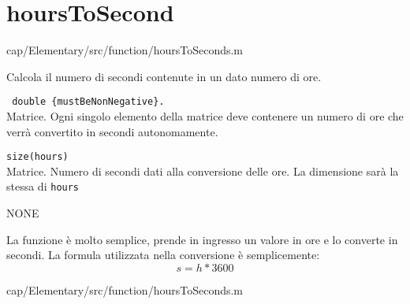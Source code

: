\section{hoursToSecond}\label{fnc:hoursToSecond}


{cap/Elementary/src/function/hoursToSeconds.m}%

Calcola il numero di secondi contenute in un dato numero di ore.

\begin{tcolorbox}
    \begin{description} 
\setlength{\itemindent}{-.2in}
    \item[\textit{hours:}] \verb| double {mustBeNonNegative}.|\\
    Matrice. Ogni singolo elemento della matrice deve contenere un numero di 
    ore che verrà convertito in secondi autonomamente.
\end{description}
\end{tcolorbox}

\begin{tcolorbox}
\begin{description}
\setlength{\itemindent}{-.2in}
    \item[\textit{seconds:}] \verb|size(hours)| \\
     Matrice. Numero di secondi dati alla conversione delle ore. La dimensione 
     sarà la stessa di \verb|hours|
\end{description}
\end{tcolorbox}

{\color{gray} NONE}

La funzione è molto semplice, prende in ingresso un valore in ore 
e lo converte in secondi. La formula utilizzata nella conversione 
è semplicemente: 
$$s=h*3600$$

{cap/Elementary/src/function/hoursToSeconds.m}%
\pagebreak

\begin{changelog}[author=\CGC, simple, title={Modifiche alla funzione}, 
    label=chgf:hoursToSecond, sectioncmd=\subsubsection*]
         
     
\end{changelog}
\newpage
%
